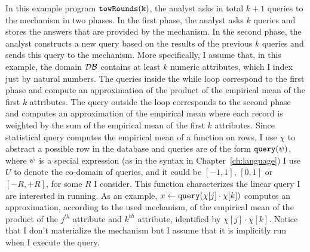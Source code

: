 \begin{example}[twoRounds]
    In this example program $\mathtt{towRounds(k)}$, the analyst asks in total $k+1$ queries to the mechanism in two phases.
    In the first phase, the analyst asks $k$ queries and stores the answers that are provided by the mechanism. 
    In the second phase, the analyst constructs a new query based on the results of the previous $k$ queries and sends this query to the mechanism. More specifically, I assume that, in this example, the domain $\mathcal{DB}$ 
    contains at least $k$ numeric attributes, which I index just by natural numbers. 
    The queries inside the while loop correspond to the first phase and compute an approximation of 
    the product of the empirical mean of the first $k$ attributes. 
    The query outside the loop corresponds to the second phase and computes an approximation of the empirical mean where each record is weighted by the sum of the empirical mean of the first $k$ attributes.
    {Since statistical query computes the empirical mean of a function on rows, I use $\chi$ to abstract a possible row in the database and }
    queries are of the form ${\tt query}(\psi)$, where $\psi$ is a special expression 
    (as in the syntax in Chapter~\ref{ch:language})
    {
      I use $U$ to denote the co-domain of queries, and it could be $[-1,1]$, $[0,1]$ or $[-R,+R]$, for some $R$ I consider.
      This function characterizes the linear query I are interested in running. 
      As an example, $x \leftarrow {\tt query}(\chi[j] \cdot \chi[k])$ computes an approximation, according to the used mechanism, of the empirical mean of the product of the $j^{th}$ attribute and $k^{th}$ attribute, identified by $\chi[j] \cdot \chi[k]$. Notice that I don't materialize the mechanism but I assume that it is implicitly run when I execute the query. } 


\end{example}
